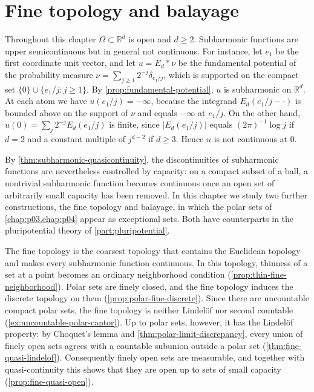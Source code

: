 \chapter{Fine topology and balayage}
\label{chap:p05}

Throughout this chapter $\Omega\subset\mathbb R^d$ is open and $d\geq2$. Subharmonic functions are upper semicontinuous but in general not continuous. For instance, let $e_1$ be the first coordinate unit vector, and let $u=E_d*\nu$ be the fundamental potential of the probability measure $\nu=\sum_{j\geq1}2^{-j}\delta_{e_1/j}$, which is supported on the compact set $\{0\}\cup\{e_1/j:j\geq1\}$. By \cref{prop:fundamental-potential}, $u$ is subharmonic on $\mathbb R^d$. At each atom we have $u(e_1/j)=-\infty$, because the integrand $E_d(e_1/j-\cdot)$ is bounded above on the support of $\nu$ and equals $-\infty$ at $e_1/j$. On the other hand, $u(0)=\sum_j2^{-j}E_d(e_1/j)$ is finite, since $|E_d(e_1/j)|$ equals $(2\pi)^{-1}\log j$ if $d=2$ and a constant multiple of $j^{d-2}$ if $d\geq3$. Hence $u$ is not continuous at $0$.

By \cref{thm:subharmonic-quasicontinuity}, the discontinuities of subharmonic functions are nevertheless controlled by capacity: on a compact subset of a ball, a nontrivial subharmonic function becomes continuous once an open set of arbitrarily small capacity has been removed. In this chapter we study two further constructions, the fine topology and balayage, in which the polar sets of \cref{chap:p03,chap:p04} appear as exceptional sets. Both have counterparts in the pluripotential theory of \cref{part:pluripotential}.

The fine topology is the coarsest topology that contains the Euclidean topology and makes every subharmonic function continuous. In this topology, thinness of a set at a point becomes an ordinary neighborhood condition (\cref{prop:thin-fine-neighborhood}). Polar sets are finely closed, and the fine topology induces the discrete topology on them (\cref{prop:polar-fine-discrete}). Since there are uncountable compact polar sets, the fine topology is neither Lindel\"of nor second countable (\cref{ex:uncountable-polar-cantor}). Up to polar sets, however, it has the Lindel\"of property: by Choquet's lemma and \cref{thm:polar-limit-discrepancy}, every union of finely open sets agrees with a countable subunion outside a polar set (\cref{thm:fine-quasi-lindelof}). Consequently finely open sets are measurable, and together with quasi-continuity this shows that they are open up to sets of small capacity (\cref{prop:fine-quasi-open}).

